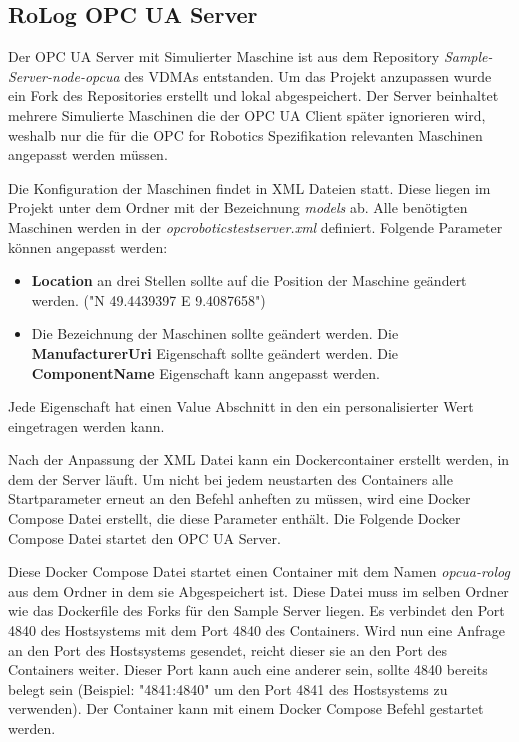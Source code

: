 \documentclass[a4paper, 12pt, oneside, toc=listofnumbered, bibliography=totoc]{scrbook}
\begin{document}
		\subsection{RoLog OPC UA Server}\label{ch:RoLogOPCUA}
		
		Der OPC UA Server mit Simulierter Maschine ist aus dem Repository \textit{Sample-Server-node-opcua} des VDMAs entstanden. Um das Projekt anzupassen wurde ein Fork des Repositories erstellt und lokal abgespeichert. Der Server beinhaltet mehrere Simulierte Maschinen die der OPC UA Client später ignorieren wird, weshalb nur die für die OPC for Robotics Spezifikation relevanten Maschinen angepasst werden müssen. 
		
		Die Konfiguration der Maschinen findet in XML Dateien statt. Diese liegen im Projekt unter dem Ordner mit der Bezeichnung \textit{models} ab. Alle benötigten Maschinen werden in der \textit{opcroboticstestserver.xml} definiert. Folgende Parameter können angepasst werden:
		
		\begin{itemize}
			\item \textbf{Location} an drei Stellen sollte auf die Position der Maschine geändert werden. ("N 49.4439397 E 9.4087658")
			\item Die Bezeichnung der Maschinen sollte geändert werden.
			\subitem Die \textbf{ManufacturerUri} Eigenschaft sollte geändert werden.
			\subitem Die \textbf{ComponentName} Eigenschaft kann angepasst werden. 
		\end{itemize}
		Jede Eigenschaft hat einen Value Abschnitt in den ein personalisierter Wert eingetragen werden kann.
		
		Nach der Anpassung der XML Datei kann ein Dockercontainer erstellt werden, in dem der Server läuft. Um nicht bei jedem neustarten des Containers alle Startparameter erneut an den Befehl anheften zu müssen, wird eine Docker Compose Datei erstellt, die diese Parameter enthält. Die Folgende Docker Compose Datei startet den OPC UA Server.
		
		
		
		Diese Docker Compose Datei startet einen Container mit dem Namen \textit{opcua-rolog} aus dem Ordner in dem sie Abgespeichert ist. Diese Datei muss im selben Ordner wie das Dockerfile des Forks für den Sample Server liegen. Es verbindet den Port 4840 des Hostsystems mit dem Port 4840 des Containers. Wird nun eine Anfrage an den Port des Hostsystems gesendet, reicht dieser sie an den Port des Containers weiter. Dieser Port kann auch eine anderer sein, sollte 4840 bereits belegt sein (Beispiel: "4841:4840" um den Port 4841 des Hostsystems zu verwenden). Der Container kann mit einem Docker Compose Befehl gestartet werden. 
		
\end{document}
